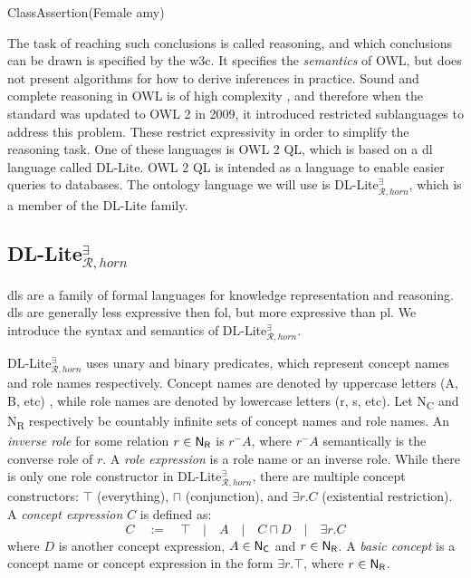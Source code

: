 \centerline{\textsf{ClassAssertion(Female amy)}}
The task of reaching such conclusions is called reasoning, and which conclusions can be drawn is specified by the \gls{w3c}. It specifies the \emph{semantics} of OWL, but does not present algorithms for how to derive inferences in practice. Sound and complete reasoning in OWL is of high complexity \cite{Krotzsch2012}, and therefore when the standard was updated to OWL 2 in 2009, it introduced restricted sublanguages to address this problem. These restrict expressivity in order to simplify the reasoning task. One of these languages is OWL 2 QL, which is based on a \gls{dl} language called DL-Lite. OWL 2 QL is intended as a language to enable easier queries to databases. The ontology language we will use is DL-Lite$_{\mathcal{R}, horn}^{\exists}$, which is a member of the DL-Lite family.

\subsection{DL-Lite$_{\mathcal{R}, horn}^{\exists}$}
\glspl{dl} are a family of formal languages for knowledge representation and reasoning. \glspl{dl} are generally less expressive then \gls{fol}, but more expressive than \gls{pl}. We introduce the syntax and semantics of  DL-Lite$_{\mathcal{R}, horn}^{\exists}$.

DL-Lite$_{\mathcal{R}, horn}^{\exists}$ uses unary and binary predicates, which represent concept names and role names respectively. Concept names are denoted by uppercase letters (A, B, etc) , while role names are denoted by lowercase letters (r, s, etc). Let \textsf{N\textsubscript{C}} and \textsf{N\textsubscript{R}} respectively be countably infinite sets of concept names and role names. An \emph{inverse role} for some relation $r \in \textsf{N\textsubscript{R}}$ is $r^-A$, where $r^-A$ semantically is the converse role of $r$. A \emph{role expression} is a role name or an inverse role. While there is only one role constructor in DL-Lite$_{\mathcal{R}, horn}^{\exists}$, there are multiple concept constructors: $\top$ (everything), $\sqcap$ (conjunction), and $\exists r.C$ (existential restriction). A \emph{concept expression} $C$ is defined as:
\[C \quad:=\quad \top\quad|\quad A \quad|\quad C\sqcap D\quad |\quad \exists r.C\]
where $D$ is another concept expression, $A\in \textsf{N\textsubscript{C}}$ and $r \in \textsf{N\textsubscript{R}}$. A \emph{basic concept} is a concept name or concept expression in the form $\exists r.\top$, where $r \in \textsf{N\textsubscript{R}}$.

